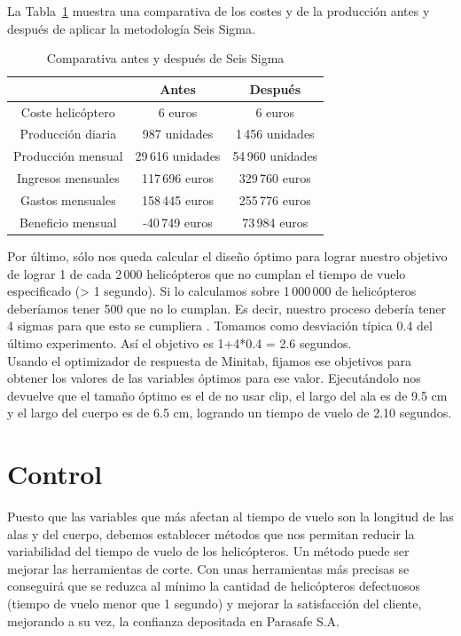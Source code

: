 \documentclass[12pt,a4paper,twoside,openright,titlepage,final]{article}
\begin{document}
La Tabla~\ref{tbl:comparativa} muestra una comparativa de los costes y de la producción antes y después de aplicar la metodología Seis Sigma.\\

\begin{table}[htbp!]
	\centering
	\caption{Comparativa antes y después de Seis Sigma}
	\label{tbl:comparativa}
	\begin{tabular}{@{}ccc@{}}
		\cmidrule(l){2-3}
		& Antes             & Después          \\ \midrule
		Coste helicóptero  & 6 euros           & 6 euros          \\
		Producción diaria  & 987 unidades      & 1\,456 unidades  \\
		Producción mensual & 29\,616  unidades & 54\,960 unidades \\
		Ingresos mensuales & 117\,696 euros    & 329\,760 euros   \\
		Gastos mensuales   & 158\,445 euros    & 255\,776 euros   \\
		Beneficio mensual  & -40\,749 euros    & 73\,984 euros    \\ \bottomrule
	\end{tabular}
\end{table}

Por último, sólo nos queda calcular el diseño óptimo para lograr nuestro objetivo de lograr 1 de cada 2\,000 helicópteros que no cumplan el tiempo de vuelo especificado (> 1 segundo). Si lo calculamos sobre 1\,000\,000 de helicópteros deberíamos tener 500 que no lo cumplan. Es decir, nuestro proceso debería tener 4 sigmas para que esto se cumpliera \cite{Sigma}. Tomamos como desviación típica 0.4 del último experimento. Así el objetivo es 1+4*0.4 = 2.6 segundos.\\

Usando el optimizador de respuesta de Minitab, fijamos ese objetivos para obtener los valores de las variables óptimos para ese valor. Ejecutándolo nos devuelve que el tamaño óptimo es el de no usar clip, el largo del ala es de 9.5 cm y el largo del cuerpo es de 6.5 cm, logrando un tiempo de vuelo de 2.10 segundos. 
 

\section{Control}

Puesto que las variables que más afectan al tiempo de vuelo son la longitud de las alas y del cuerpo, debemos establecer métodos que nos permitan reducir la variabilidad del tiempo de vuelo de los helicópteros. Un método puede ser mejorar las herramientas de corte. Con unas herramientas más precisas se conseguirá que se reduzca al mínimo la cantidad de helicópteros defectuosos (tiempo de vuelo menor que 1 segundo) y mejorar la satisfacción del cliente, mejorando a su vez, la confianza depositada en Parasafe S.A. 
\end{document}
